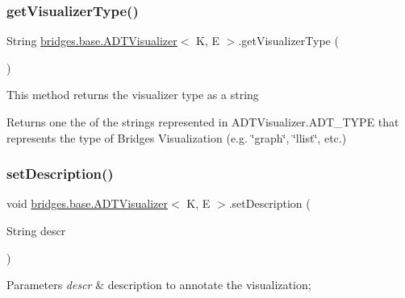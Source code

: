 \subsubsection{\texorpdfstring{get\+Visualizer\+Type()}{getVisualizerType()}}
{\footnotesize\ttfamily String \hyperlink{classbridges_1_1base_1_1_a_d_t_visualizer}{bridges.\+base.\+A\+D\+T\+Visualizer}$<$ K, E $>$.get\+Visualizer\+Type (\begin{DoxyParamCaption}{ }\end{DoxyParamCaption})}

This method returns the visualizer type as a string \begin{DoxyReturn}{Returns}
one the of the strings represented in A\+D\+T\+Visualizer.\+A\+D\+T\+\_\+\+T\+Y\+PE that represents the type of Bridges Visualization (e.\+g. \char`\"{}graph\char`\"{}, \char`\"{}llist\char`\"{}, etc.) 
\end{DoxyReturn}
\hypertarget{classbridges_1_1base_1_1_a_d_t_visualizer_ab00d1c82e11326ce68c0146bc393c4b1}{}\label{classbridges_1_1base_1_1_a_d_t_visualizer_ab00d1c82e11326ce68c0146bc393c4b1} 
\subsubsection{\texorpdfstring{set\+Description()}{setDescription()}}
{\footnotesize\ttfamily void \hyperlink{classbridges_1_1base_1_1_a_d_t_visualizer}{bridges.\+base.\+A\+D\+T\+Visualizer}$<$ K, E $>$.set\+Description (\begin{DoxyParamCaption}\item[{String}]{descr }\end{DoxyParamCaption})}


\begin{DoxyParams}{Parameters}
{\em descr} & description to annotate the visualization; \\
\hline
\end{DoxyParams}
\hypertarget{classbridges_1_1base_1_1_a_d_t_visualizer_ab0fda74356fefe16f5b3b98a5fce1f9e}{}\label{classbridges_1_1base_1_1_a_d_t_visualizer_ab0fda74356fefe16f5b3b98a5fce1f9e} 
